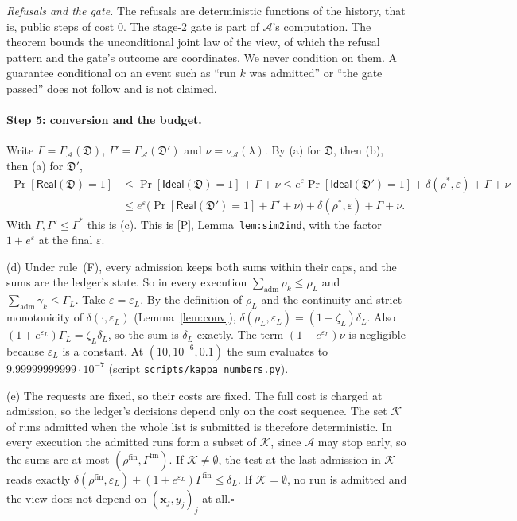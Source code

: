\documentclass[11pt]{article}
\theoremstyle{definition}
\theoremstyle{plain}
\newcommand{\bx}{\mathbf{x}}
\newcommand{\bD}{\mathfrak D}
\newcommand{\Real}{\mathsf{Real}}
\newcommand{\Ideal}{\mathsf{Ideal}}
\newcommand{\adm}{\mathrm{adm}}
\newcommand{\Pp}{\textup{[P]}}
\begin{document}
\emph{Refusals and the gate.} The refusals are deterministic functions of the history, that is, public steps of cost $0$. The stage-2 gate is part of $\mathcal A$'s computation. The theorem bounds the unconditional joint law of the view, of which the refusal pattern and the gate's outcome are coordinates. We never condition on them. A guarantee conditional on an event such as ``run $k$ was admitted'' or ``the gate passed'' does not follow and is not claimed.

\paragraph{Step 5: conversion and the budget.}
Write $\Gamma=\Gamma_{\mathcal A}(\bD)$, $\Gamma'=\Gamma_{\mathcal A}(\bD')$ and $\nu=\nu_{\mathcal A}(\lambda)$. By (a) for $\bD$, then (b), then (a) for $\bD'$,
\[
  \begin{aligned}
  \Pr[\Real(\bD)=1]&\le\Pr[\Ideal(\bD)=1]+\Gamma+\nu\le e^\varepsilon\Pr[\Ideal(\bD')=1]+\delta(\rho^*,\varepsilon)+\Gamma+\nu\\
  &\le e^\varepsilon\bigl(\Pr[\Real(\bD')=1]+\Gamma'+\nu\bigr)+\delta(\rho^*,\varepsilon)+\Gamma+\nu .
  \end{aligned}
\]
With $\Gamma,\Gamma'\le\Gamma^*$ this is (c). This is \Pp, Lemma~\texttt{lem:sim2ind}, with the factor $1+e^{\varepsilon}$ at the final $\varepsilon$.

(d) Under rule~(F), every admission keeps both sums within their caps, and the sums are the ledger's state. So in every execution $\sum_{\adm}\rho_k\le\rho_L$ and $\sum_{\adm}\gamma_k\le\Gamma_L$. Take $\varepsilon=\varepsilon_L$. By the definition of $\rho_L$ and the continuity and strict monotonicity of $\delta(\cdot,\varepsilon_L)$ (Lemma~\ref{lem:conv}), $\delta(\rho_L,\varepsilon_L)=(1-\zeta_L)\delta_L$. Also $(1+e^{\varepsilon_L})\Gamma_L=\zeta_L\delta_L$, so the sum is $\delta_L$ exactly. The term $(1+e^{\varepsilon_L})\nu$ is negligible because $\varepsilon_L$ is a constant. At $(10,10^{-6},0.1)$ the sum evaluates to $9.99999999999\cdot10^{-7}$ (script \texttt{scripts/kappa\_numbers.py}).

(e) The requests are fixed, so their costs are fixed. The full cost is charged at admission, so the ledger's decisions depend only on the cost sequence. The set $\mathcal K$ of runs admitted when the whole list is submitted is therefore deterministic. In every execution the admitted runs form a subset of $\mathcal K$, since $\mathcal A$ may stop early, so the sums are at most $(\rho^{\mathrm{fin}},\Gamma^{\mathrm{fin}})$. If $\mathcal K\neq\emptyset$, the test at the last admission in $\mathcal K$ reads exactly $\delta(\rho^{\mathrm{fin}},\varepsilon_L)+(1+e^{\varepsilon_L})\Gamma^{\mathrm{fin}}\le\delta_L$. If $\mathcal K=\emptyset$, no run is admitted and the view does not depend on $(\bx_j,y_j)_j$ at all.\hfill$\square$
\end{document}
